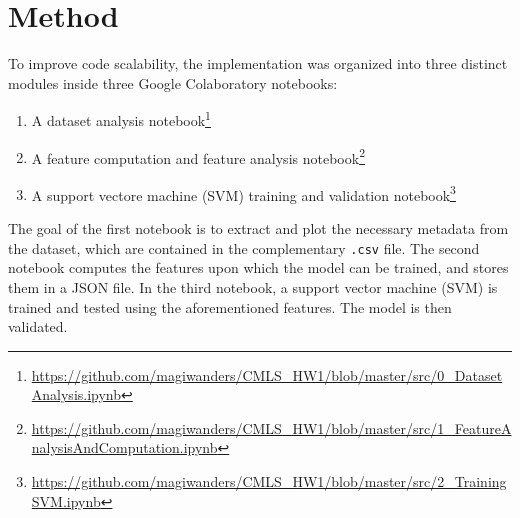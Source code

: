 \documentclass{article}
\newcommand{\code}{\texttt}
\begin{document}
\section{Method}
To improve code scalability, the implementation was organized into three distinct modules inside three Google Colaboratory \cite{googleColab} notebooks:
\begin{enumerate}
    \item A dataset analysis notebook\footnote{\url{https://github.com/magiwanders/CMLS_HW1/blob/master/src/0_DatasetAnalysis.ipynb}}
    \item A feature computation and feature analysis notebook\footnote{\url{https://github.com/magiwanders/CMLS_HW1/blob/master/src/1_FeatureAnalysisAndComputation.ipynb}}
    \item A support vectore machine (SVM) training and validation notebook\footnote{\url{https://github.com/magiwanders/CMLS_HW1/blob/master/src/2_TrainingSVM.ipynb}}
\end{enumerate}
The goal of the first notebook is to extract and plot the necessary metadata from the dataset, which are contained in the complementary \code{.csv} file. The second notebook computes the features upon which the model can be trained, and stores them in a JSON file. In the third notebook, a support vector machine (SVM) is trained and tested using the aforementioned features. The model is then validated.
\end{document}
